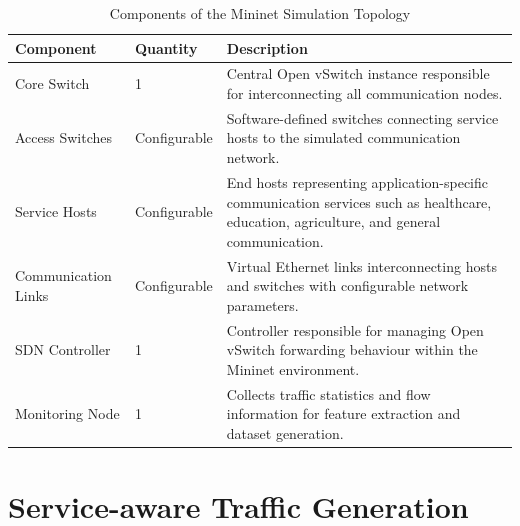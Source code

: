 \documentclass[12pt,a4paper]{report}
\begin{document}
	\begin{table}[H]
		\centering
		\caption{Components of the Mininet Simulation Topology}
		\label{tab:topology}
		
		\begin{tabular}{|p{4cm}|p{2.5cm}|p{8cm}|}
			\hline
			
			\textbf{Component} &
			\textbf{Quantity} &
			\textbf{Description}
			\\
			\hline
			
			Core Switch &
			1 &
			Central Open vSwitch instance responsible for interconnecting all communication nodes.
			\\
			\hline
			
			Access Switches &
			Configurable &
			Software-defined switches connecting service hosts to the simulated communication network.
			\\
			\hline
			
			Service Hosts &
			Configurable &
			End hosts representing application-specific communication services such as healthcare, education, agriculture, and general communication.
			\\
			\hline
			
			Communication Links &
			Configurable &
			Virtual Ethernet links interconnecting hosts and switches with configurable network parameters.
			\\
			\hline
			
			SDN Controller &
			1 &
			Controller responsible for managing Open vSwitch forwarding behaviour within the Mininet environment.
			\\
			\hline
			
			Monitoring Node &
			1 &
			Collects traffic statistics and flow information for feature extraction and dataset generation.
			\\
			\hline
			
		\end{tabular}
		
	\end{table}
	
	
	\section{Service-aware Traffic Generation}
	\label{sec:traffic_generation}
	
\end{document}
